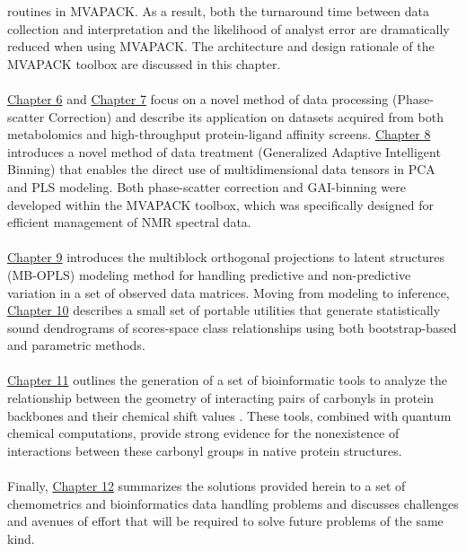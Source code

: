 \begin{doublespace}
routines in MVAPACK. As a result, both the turnaround time between data
collection and interpretation and the likelihood of analyst error are
dramatically reduced when using MVAPACK. The architecture and design rationale
of the MVAPACK toolbox are discussed in this chapter.
\\\\
\hyperlink{chapter.6}{Chapter 6} and \hyperlink{chapter.7}{Chapter 7} focus on
a novel method of data processing (Phase-scatter Correction) and describe its
application on datasets acquired from both metabolomics and high-throughput
protein-ligand affinity screens. \hyperlink{chapter.8}{Chapter 8} introduces
a novel method of data treatment (Generalized Adaptive Intelligent Binning)
that enables the direct use of multidimensional data tensors in PCA and PLS
modeling. Both phase-scatter correction and GAI-binning were developed within
the MVAPACK toolbox, which was specifically designed for efficient management
of NMR spectral data.
\\\\
\hyperlink{chapter.9}{Chapter 9} introduces the multiblock orthogonal
projections to latent structures (MB-OPLS) modeling method for handling
predictive and non-predictive variation in a set of observed data matrices.
Moving from modeling to inference, \hyperlink{chapter.10}{Chapter 10} describes
a small set of portable utilities that generate statistically sound dendrograms
of scores-space class relationships using both bootstrap-based and parametric
methods.
\\\\
\hyperlink{chapter.11}{Chapter 11} outlines the generation of a set of
bioinformatic tools to analyze the relationship between the geometry of
interacting pairs of carbonyls in protein backbones and their \cnmr{} chemical
shift values \cite{worley:pone2012}. These tools, combined with quantum
chemical computations, provide strong evidence for the nonexistence of
\npistar{} interactions between these carbonyl groups in native protein
structures.
\\\\
Finally, \hyperlink{chapter.12}{Chapter 12} summarizes the solutions provided
herein to a set of chemometrics and bioinformatics data handling problems and
discusses challenges and avenues of effort that will be required to solve
future problems of the same kind.
\end{doublespace}




